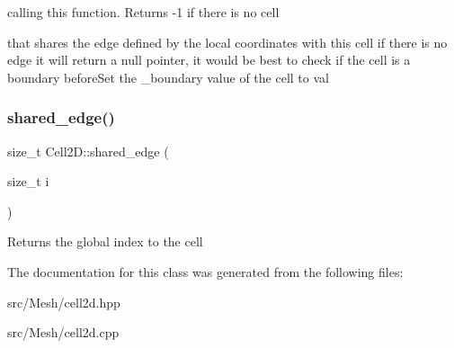 calling this function. Returns -\/1 if there is no cell 

that shares the edge defined by the local coordinates with this cell if there is no edge it will return a null pointer, it would be best to check if the cell is a boundary before\+Set the \+\_\+boundary value of the cell to val \mbox{\label{classHArDCore2D_1_1Cell2D_a7ec95ac9c1ef2551f6ca2a4b2078ee40}} 
\subsubsection{\texorpdfstring{shared\+\_\+edge()}{shared\_edge()}}
{\footnotesize\ttfamily size\+\_\+t Cell2\+D\+::shared\+\_\+edge (\begin{DoxyParamCaption}\item[{size\+\_\+t}]{i }\end{DoxyParamCaption})}

Returns the global index to the cell 

The documentation for this class was generated from the following files\+:\begin{DoxyCompactItemize}
\item 
src/\+Mesh/cell2d.\+hpp\item 
src/\+Mesh/cell2d.\+cpp\end{DoxyCompactItemize}

